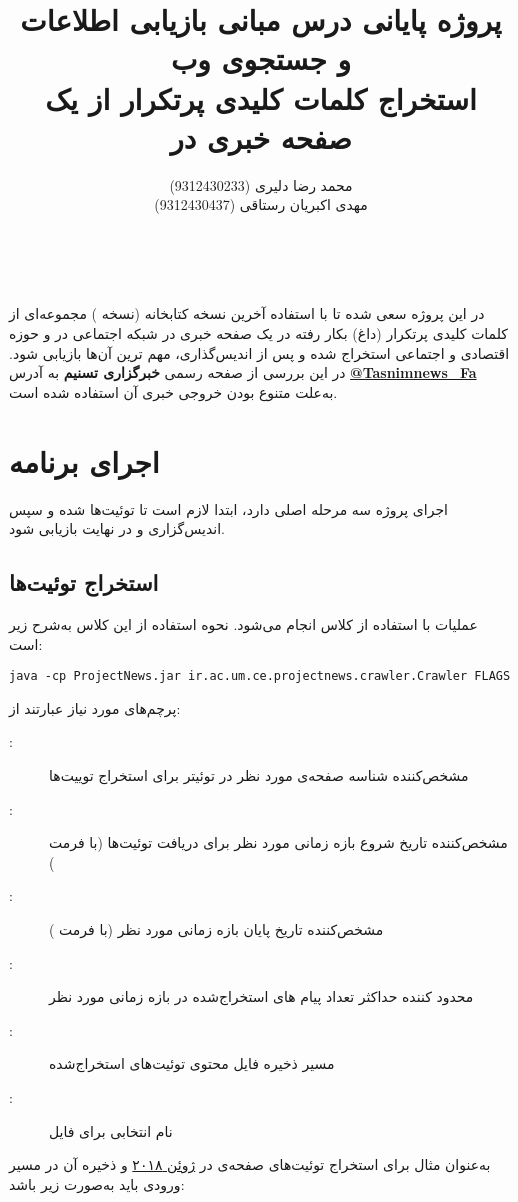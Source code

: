 \documentclass[a4paper, 12pt]{article}
\title{
{\large{پروژه پایانی درس مبانی بازیابی اطلاعات و جستجوی وب}}
\\
استخراج کلمات کلیدی پرتکرار از یک صفحه خبری در \lr{Twitter }
}
\author{
محمد رضا دلیری (9312430233) \\
مهدی اکبریان رستاقی (9312430437)
}
\date{}
\newcommand\code[1]{\lr{\ttfamily\fontseries{b}\selectfont{#1}}}
\renewcommand{\arraystretch}{1.7}
\begin{document}
{
    \renewcommand{\arraystretch}{1}
    \maketitle
}
‎‎

در این پروژه سعی شده تا با استفاده آخرین نسخه کتابخانه  (نسخه )  مجموعه‌ای از کلمات کلیدی پرتکرار (داغ) بکار رفته در یک صفحه خبری در شبکه اجتماعی  در و حوزه اقتصادی و اجتماعی استخراج شده و پس از اندیس‌گذاری، مهم ترین آن‌ها بازیابی شود. در این بررسی از صفحه رسمی \textbf{خبرگزاری تسنیم} به آدرس 
\href{https://twitter.com/Tasnimnews\_Fa}{\textbf{@Tasnimnews\_Fa}}
به‌علت متنوع بودن خروجی خبری آن استفاده شده است.
\section{اجرای برنامه}
اجرای پروژه سه مرحله اصلی دارد، ابتدا لازم است تا توئیت‌ها   شده و سپس اندیس‌گزاری و در نهایت بازیابی شود.
\subsection{استخراج توئیت‌ها}
عملیات  با استفاده از کلاس \code{Crawler} انجام می‌شود. نحوه استفاده از این کلاس به‌شرح زیر است:
\begin{latin}
    \begin{lstlisting}
java -cp ProjectNews.jar ir.ac.um.ce.projectnews.crawler.Crawler FLAGS
    \end{lstlisting}
\end{latin}
پرچم‌های مورد نیاز عبارتند از:
\begin{description}
\item[\code{-i}:]
 مشخص‌کننده شناسه صفحه‌ی مورد نظر در توئیتر برای استخراج توییت‌ها
\item[\code{-s}:] 
مشخص‌کننده تاریخ شروع بازه زمانی مورد نظر برای دریافت توئیت‌ها (با فرمت \code{YYYY-MM-DD})

\item[\code{-e}:]
مشخص‌کننده تاریخ پایان بازه زمانی مورد نظر (با فرمت \code{YYYY-MM-DD})

\item[\code{-m}:]
محدود کننده حداکثر تعداد پیام های استخراج‌شده در بازه زمانی مورد نظر

\item[\code{-p}:]
مسیر ذخیره فایل  محتوی توئیت‌های استخراج‌شده

\item[\code{-n}:] 
نام انتخابی برای فایل 
\end{description}
به‌عنوان مثال برای استخراج توئیت‌های صفحه‌ی  \textbf{} در 
\underline{ژوئن ۲۰۱۸}
و ذخیره آن در مسیر \textbf{\code{out}} ورودی باید به‌صورت زیر باشد:
\end{document}
